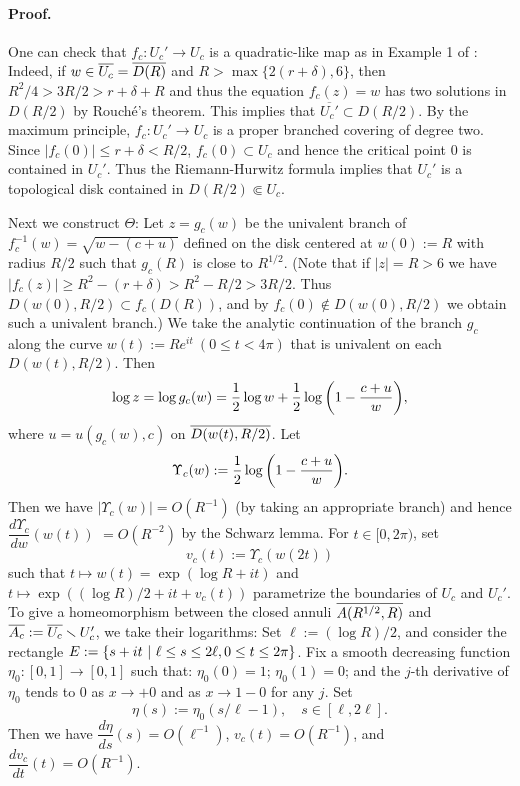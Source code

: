 \paragraph{\bf Proof.}
One can check that $f_c:U_c' \to U_c$ is a quadratic-like map
as in Example 1 of \cite[p.329]{Douady-Hubbard 1985}: 
Indeed, if $w \in \Bar{U_c}=\Bar{D(R)}$ and 
$R > \max\{2(r+\delta), 6\}$, 
then $R^2/4 > 3R/2 >r+\delta +R$ and 
thus the equation $f_c(z)=w$ 
has two solutions in $D(R/2)$ by Rouch\'e's theorem. 
This implies that $\overline{U_c'} \subset D(R/2)$.
By the maximum principle, 
$f_c:U_c' \to U_c$ is a proper branched covering of degree two.
Since $|f_c(0)| \le r+\delta <R/2$,
$f_c(0) \subset U_c$ and hence 
the critical point $0$ is contained in $U_c'$.
Thus the Riemann-Hurwitz formula
implies that $U_c'$ is a topological disk contained in $D(R/2) \Subset U_c$.

Next we construct $\Theta$:
Let $z=g_c(w)$ be the univalent branch of $f_c^{-1}(w)=\sqrt{w-(c+u)}$ 
defined on the disk centered at $w(0):=R$ with radius $R/2$
such that $g_c(R)$ is close to $R^{1/2}$.
(Note that if $|z|=R>6$
we have $|f_c(z)| \ge R^2-(r+\delta) >R^2-R/2>3R/2$.
Thus $D(w(0),R/2) \subset f_c(D(R))$,
and by $f_c(0) \notin D(w(0),R/2)$ 
we obtain such a univalent branch.)
We take the analytic continuation of the branch $g_c$ 
along the curve $w(t):=Re^{it}~(0 \le t < 4\pi)$
that is univalent on each $D(w(t), R/2)$.
Then 
$$
\log z = \log g_c(w)= 
\frac{1}{2}\log w + \frac{1}{2} \log \paren{1-\frac{c+u}{w}},
$$
where $u=u(g_c(w),c)$ on $\Bar{D(w(t), R/2)}$.
Let
$$
\Upsilon_c(w):=\frac{1}{2} \log \paren{1-\frac{c+u}{w}}.
$$
Then we have
$|\Upsilon_c(w)| =O(R^{-1})$ (by taking an appropriate branch)
and hence
$\dfrac{d\Upsilon_c}{dw}(w(t))$ $= O(R^{-2})$
by the Schwarz lemma.
For $t \in [0,2\pi)$,
set 
$$
v_c(t):=\Upsilon_c(w(2t))
$$
such that 
$t \mapsto w(t)=\exp(\log R+ it)$ 
and 
$t \mapsto \exp((\log R)/2+ it+v_c(t))$
parametrize the boundaries of $U_c$ and $U_c'$.
To give a homeomorphism between the closed annuli
$\Bar{A(R^{1/2},R)}$ and
$\Bar{A_c}:=\Bar{U_c} \sminus {U_c'}$, we take their logarithms:
Set $\ell:=(\log R)/2$, and consider 
the rectangle $E:=\{ s+it \st \ell \le s \le 2\ell,  0\le t \le 2\pi\}$. 
Fix a smooth decreasing function $\eta_0:[0,1] \to [0,1]$
such that: $\eta_0(0)=1$; $\eta_0(1)=0$; 
and the $j$-th derivative 
of $\eta_0$ tends to $0$ as $x \to +0$ and as $x \to 1-0$ for any $j$.
Set 
$$
\eta(s):=\eta_0(s/\ell -1),\quad s \in [\ell, 2\ell]. 
$$ 
Then we have $\dfrac{d\eta}{ds}(s) = O(\ell^{-1})$, 
$v_c(t) =O(R^{-1})$, and 
$\dfrac{dv_c}{dt}(t)=O(R^{-1})$.

